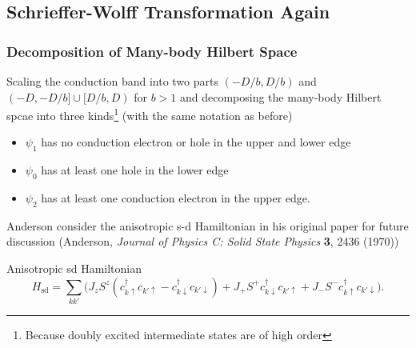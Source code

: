 \documentclass[10pt,aspectratio=43,xcolor=x11names]{beamer}%
\begin{document}
	\subsection{Schrieffer-Wolff Transformation Again}
		\begin{frame}\frametitle{Decomposition of Many-body Hilbert Space}
			Scaling the conduction band into two parts $(-D/b,D/b)$ and $(-D,-D/b]\cup[D/b,D)$ for $b>1$ and decomposing the many-body Hilbert spcae into three kinds\footnote{Because doubly excited intermediate states are of high order} (with the same notation as before)
			\begin{itemize}
				\item $\psi_1$ has no conduction electron or hole in the upper and lower edge
				\item $\psi_0$ has at least one hole in the lower edge
				\item $\psi_2$ has at least one conduction electron in the upper edge.
			\end{itemize}
			\pause
			Anderson consider the {\color{blue}anisotropic} s-d Hamiltonian in his original paper for future discussion (Anderson, \textit{Journal of Physics C: Solid State Physics} \textbf{3}, 2436 (1970))
			\begin{block}{Anisotropic sd Hamiltonian}
				\begin{equation*}
					H_{\text{sd}}=\sum_{kk'}\bigg(J_zS^z(c_{k\uparrow}^\dagger c_{k'\uparrow}-c_{k\downarrow}^\dagger c_{k'\downarrow})+J_+S^+c_{k\downarrow}^\dagger c_{k'\uparrow}+J_-S^-c_{k\uparrow}^\dagger c_{k'\downarrow}\bigg).
				\end{equation*}
			\end{block}
		\end{frame}
\end{document}
